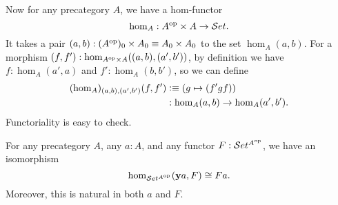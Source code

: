 \documentclass[hott-all.tex]{subfiles}
\begin{document}
Now for any precategory $A$, we have a hom-functor
%
\[\hom_A : A\op \times A \to \uset.\]
It takes a pair $(a,b): (A\op)_0 \times A_0 \jdeq A_0 \times A_0$ to the set $\hom_A(a,b)$.
For a morphism $(f,f') : \hom_{A\op\times A}((a,b),(a',b'))$, by definition we have $f:\hom_A(a',a)$ and $f':\hom_A(b,b')$, so we can define
\begin{align*}
  (\hom_A)_{(a,b),(a',b')}(f,f')
  &\defeq (g \mapsto (f'gf))\\
  &: \hom_A(a,b) \to \hom_A(a',b').
\end{align*}
Functoriality is easy to check.

%
\begin{thm}
  For any precategory $A$, any $a:A$, and any functor $F:\uset^{A\op}$, we have an isomorphism
  \begin{equation}\fakelabel{eq:yoneda}
    \hom_{\uset^{A\op}}(\y a, F) \cong Fa.
  \end{equation}
  Moreover, this is natural in both $a$ and $F$.
\end{thm}
%
%
\end{document}

